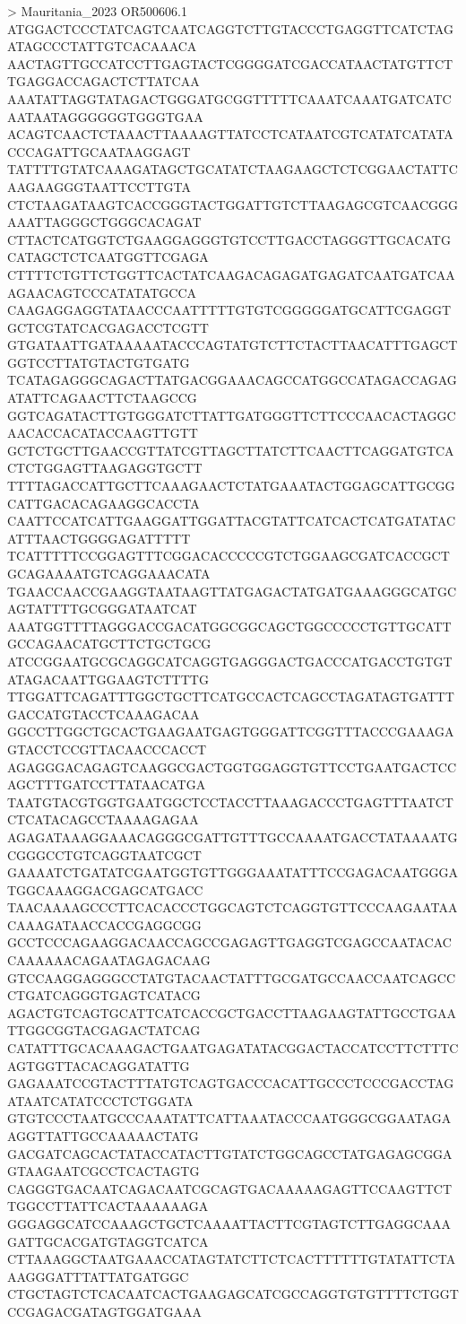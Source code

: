 > Mauritania_2023 OR500606.1
ATGGACTCCCTATCAGTCAATCAGGTCTTGTACCCTGAGGTTCATCTAGATAGCCCTATTGTCACAAACA
AACTAGTTGCCATCCTTGAGTACTCGGGGATCGACCATAACTATGTTCTTGAGGACCAGACTCTTATCAA
AAATATTAGGTATAGACTGGGATGCGGTTTTTCAAATCAAATGATCATCAATAATAGGGGGGTGGGTGAA
ACAGTCAACTCTAAACTTAAAAGTTATCCTCATAATCGTCATATCATATACCCAGATTGCAATAAGGAGT
TATTTTGTATCAAAGATAGCTGCATATCTAAGAAGCTCTCGGAACTATTCAAGAAGGGTAATTCCTTGTA
CTCTAAGATAAGTCACCGGGTACTGGATTGTCTTAAGAGCGTCAACGGGAAATTAGGGCTGGGCACAGAT
CTTACTCATGGTCTGAAGGAGGGTGTCCTTGACCTAGGGTTGCACATGCATAGCTCTCAATGGTTCGAGA
CTTTTCTGTTCTGGTTCACTATCAAGACAGAGATGAGATCAATGATCAAAGAACAGTCCCATATATGCCA
CAAGAGGAGGTATAACCCAATTTTTGTGTCGGGGGATGCATTCGAGGTGCTCGTATCACGAGACCTCGTT
GTGATAATTGATAAAAATACCCAGTATGTCTTCTACTTAACATTTGAGCTGGTCCTTATGTACTGTGATG
TCATAGAGGGCAGACTTATGACGGAAACAGCCATGGCCATAGACCAGAGATATTCAGAACTTCTAAGCCG
GGTCAGATACTTGTGGGATCTTATTGATGGGTTCTTCCCAACACTAGGCAACACCACATACCAAGTTGTT
GCTCTGCTTGAACCGTTATCGTTAGCTTATCTTCAACTTCAGGATGTCACTCTGGAGTTAAGAGGTGCTT
TTTTAGACCATTGCTTCAAAGAACTCTATGAAATACTGGAGCATTGCGGCATTGACACAGAAGGCACCTA
CAATTCCATCATTGAAGGATTGGATTACGTATTCATCACTCATGATATACATTTAACTGGGGAGATTTTT
TCATTTTTCCGGAGTTTCGGACACCCCCGTCTGGAAGCGATCACCGCTGCAGAAAATGTCAGGAAACATA
TGAACCAACCGAAGGTAATAAGTTATGAGACTATGATGAAAGGGCATGCAGTATTTTGCGGGATAATCAT
AAATGGTTTTAGGGACCGACATGGCGGCAGCTGGCCCCCTGTTGCATTGCCAGAACATGCTTCTGCTGCG
ATCCGGAATGCGCAGGCATCAGGTGAGGGACTGACCCATGACCTGTGTATAGACAATTGGAAGTCTTTTG
TTGGATTCAGATTTGGCTGCTTCATGCCACTCAGCCTAGATAGTGATTTGACCATGTACCTCAAAGACAA
GGCCTTGGCTGCACTGAAGAATGAGTGGGATTCGGTTTACCCGAAAGAGTACCTCCGTTACAACCCACCT
AGAGGGACAGAGTCAAGGCGACTGGTGGAGGTGTTCCTGAATGACTCCAGCTTTGATCCTTATAACATGA
TAATGTACGTGGTGAATGGCTCCTACCTTAAAGACCCTGAGTTTAATCTCTCATACAGCCTAAAAGAGAA
AGAGATAAAGGAAACAGGGCGATTGTTTGCCAAAATGACCTATAAAATGCGGGCCTGTCAGGTAATCGCT
GAAAATCTGATATCGAATGGTGTTGGGAAATATTTCCGAGACAATGGGATGGCAAAGGACGAGCATGACC
TAACAAAAGCCCTTCACACCCTGGCAGTCTCAGGTGTTCCCAAGAATAACAAAGATAACCACCGAGGCGG
GCCTCCCAGAAGGACAACCAGCCGAGAGTTGAGGTCGAGCCAATACACCAAAAAACAGAATAGAGACAAG
GTCCAAGGAGGGCCTATGTACAACTATTTGCGATGCCAACCAATCAGCCCTGATCAGGGTGAGTCATACG
AGACTGTCAGTGCATTCATCACCGCTGACCTTAAGAAGTATTGCCTGAATTGGCGGTACGAGACTATCAG
CATATTTGCACAAAGACTGAATGAGATATACGGACTACCATCCTTCTTTCAGTGGTTACACAGGATATTG
GAGAAATCCGTACTTTATGTCAGTGACCCACATTGCCCTCCCGACCTAGATAATCATATCCCTCTGGATA
GTGTCCCTAATGCCCAAATATTCATTAAATACCCAATGGGCGGAATAGAAGGTTATTGCCAAAAACTATG
GACGATCAGCACTATACCATACTTGTATCTGGCAGCCTATGAGAGCGGAGTAAGAATCGCCTCACTAGTG
CAGGGTGACAATCAGACAATCGCAGTGACAAAAAGAGTTCCAAGTTCTTGGCCTTATTCACTAAAAAAGA
GGGAGGCATCCAAAGCTGCTCAAAATTACTTCGTAGTCTTGAGGCAAAGATTGCACGATGTAGGTCATCA
CTTAAAGGCTAATGAAACCATAGTATCTTCTCACTTTTTTGTATATTCTAAAGGGATTTATTATGATGGC
CTGCTAGTCTCACAATCACTGAAGAGCATCGCCAGGTGTGTTTTCTGGTCCGAGACGATAGTGGATGAAA
